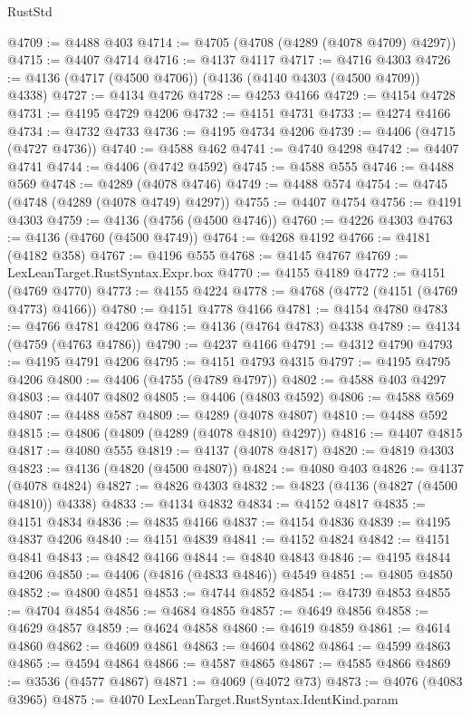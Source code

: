 \begin{lexlean}{RustStd}
\begin{coremodule}
@4709 := @4488 @403
@4714 := @4705 (@4708 (@4289 (@4078 @4709) @4297))
@4715 := @4407 @4714
@4716 := @4137 @4117
@4717 := @4716 @4303
@4726 := @4136 (@4717 (@4500 @4706)) (@4136 (@4140 @4303 (@4500 @4709)) @4338)
@4727 := @4134 @4726
@4728 := @4253 @4166
@4729 := @4154 @4728
@4731 := @4195 @4729 @4206
@4732 := @4151 @4731
@4733 := @4274 @4166
@4734 := @4732 @4733
@4736 := @4195 @4734 @4206
@4739 := @4406 (@4715 (@4727 @4736))
@4740 := @4588 @462
@4741 := @4740 @4298
@4742 := @4407 @4741
@4744 := @4406 (@4742 @4592)
@4745 := @4588 @555
@4746 := @4488 @569
@4748 := @4289 (@4078 @4746)
@4749 := @4488 @574
@4754 := @4745 (@4748 (@4289 (@4078 @4749) @4297))
@4755 := @4407 @4754
@4756 := @4191 @4303
@4759 := @4136 (@4756 (@4500 @4746))
@4760 := @4226 @4303
@4763 := @4136 (@4760 (@4500 @4749))
@4764 := @4268 @4192
@4766 := @4181 (@4182 @358)
@4767 := @4196 @555
@4768 := @4145 @4767
@4769 := LexLeanTarget.RustSyntax.Expr.box
@4770 := @4155 @4189
@4772 := @4151 (@4769 @4770)
@4773 := @4155 @4224
@4778 := @4768 (@4772 (@4151 (@4769 @4773) @4166))
@4780 := @4151 @4778 @4166
@4781 := @4154 @4780
@4783 := @4766 @4781 @4206
@4786 := @4136 (@4764 @4783) @4338
@4789 := @4134 (@4759 (@4763 @4786))
@4790 := @4237 @4166
@4791 := @4312 @4790
@4793 := @4195 @4791 @4206
@4795 := @4151 @4793 @4315
@4797 := @4195 @4795 @4206
@4800 := @4406 (@4755 (@4789 @4797))
@4802 := @4588 @403 @4297
@4803 := @4407 @4802
@4805 := @4406 (@4803 @4592)
@4806 := @4588 @569
@4807 := @4488 @587
@4809 := @4289 (@4078 @4807)
@4810 := @4488 @592
@4815 := @4806 (@4809 (@4289 (@4078 @4810) @4297))
@4816 := @4407 @4815
@4817 := @4080 @555
@4819 := @4137 (@4078 @4817)
@4820 := @4819 @4303
@4823 := @4136 (@4820 (@4500 @4807))
@4824 := @4080 @403
@4826 := @4137 (@4078 @4824)
@4827 := @4826 @4303
@4832 := @4823 (@4136 (@4827 (@4500 @4810)) @4338)
@4833 := @4134 @4832
@4834 := @4152 @4817
@4835 := @4151 @4834
@4836 := @4835 @4166
@4837 := @4154 @4836
@4839 := @4195 @4837 @4206
@4840 := @4151 @4839
@4841 := @4152 @4824
@4842 := @4151 @4841
@4843 := @4842 @4166
@4844 := @4840 @4843
@4846 := @4195 @4844 @4206
@4850 := @4406 (@4816 (@4833 @4846)) @4549
@4851 := @4805 @4850
@4852 := @4800 @4851
@4853 := @4744 @4852
@4854 := @4739 @4853
@4855 := @4704 @4854
@4856 := @4684 @4855
@4857 := @4649 @4856
@4858 := @4629 @4857
@4859 := @4624 @4858
@4860 := @4619 @4859
@4861 := @4614 @4860
@4862 := @4609 @4861
@4863 := @4604 @4862
@4864 := @4599 @4863
@4865 := @4594 @4864
@4866 := @4587 @4865
@4867 := @4585 @4866
@4869 := @3536 (@4577 @4867)
@4871 := @4069 (@4072 @73)
@4873 := @4076 (@4083 @3965)
@4875 := @4070 LexLeanTarget.RustSyntax.IdentKind.param

\end{coremodule}
\end{lexlean}
